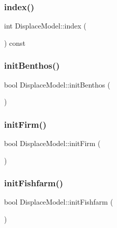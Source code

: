 \subsubsection{\texorpdfstring{index()}{index()}}
{\footnotesize\ttfamily int Displace\+Model\+::index (\begin{DoxyParamCaption}{ }\end{DoxyParamCaption}) const\hspace{0.3cm}{\ttfamily [inline]}}

\mbox{\label{class_displace_model_a94e2ae0c016042fed2ed777dc952f898}} 
\subsubsection{\texorpdfstring{initBenthos()}{initBenthos()}}
{\footnotesize\ttfamily bool Displace\+Model\+::init\+Benthos (\begin{DoxyParamCaption}{ }\end{DoxyParamCaption})\hspace{0.3cm}{\ttfamily [protected]}}

\mbox{\label{class_displace_model_a1fc67ed4597e86906b49790babe54573}} 
\subsubsection{\texorpdfstring{initFirm()}{initFirm()}}
{\footnotesize\ttfamily bool Displace\+Model\+::init\+Firm (\begin{DoxyParamCaption}{ }\end{DoxyParamCaption})\hspace{0.3cm}{\ttfamily [protected]}}

\mbox{\label{class_displace_model_a250d86a5f096568c9f797647b96fd481}} 
\subsubsection{\texorpdfstring{initFishfarm()}{initFishfarm()}}
{\footnotesize\ttfamily bool Displace\+Model\+::init\+Fishfarm (\begin{DoxyParamCaption}{ }\end{DoxyParamCaption})\hspace{0.3cm}{\ttfamily [protected]}}

